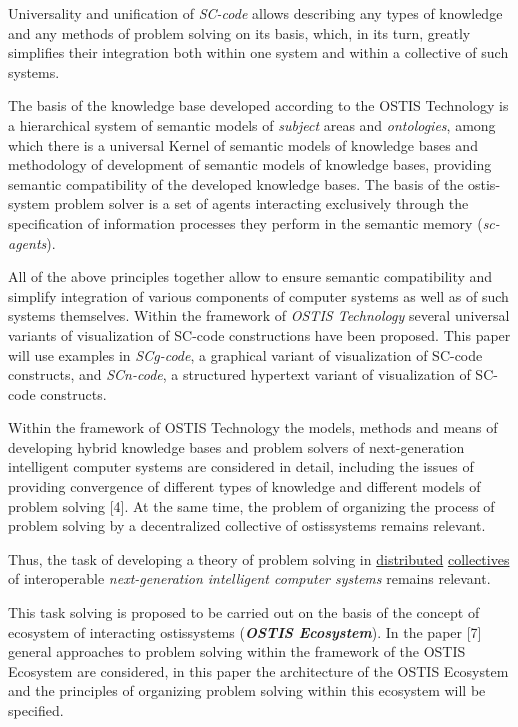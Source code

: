 \documentclass[a4paper,10pt]{article}
\begin{document}
\begin{multicols}{2}
Universality and unification of \textit{SC-code} allows describing any types of knowledge and any methods of problem
solving on its basis, which, in its turn, greatly simplifies
their integration both within one system and within a
collective of such systems. 


The basis of the knowledge base developed according
to the OSTIS Technology is a hierarchical system of
semantic models of \textit{subject} areas and \textit{ontologies}, among
which there is a universal Kernel of semantic models
of knowledge bases and methodology of development of
semantic models of knowledge bases, providing semantic
compatibility of the developed knowledge bases. The
basis of the ostis-system problem solver is a set of
agents interacting exclusively through the specification
of information processes they perform in the semantic
memory (\textit{sc-agents}). 


All of the above principles together allow to ensure
semantic compatibility and simplify integration of various components of computer systems as well as of
such systems themselves. Within the framework of \textit{OSTIS
Technology} several universal variants of visualization of
SC-code constructions have been proposed. This paper
will use examples in \textit{SCg-code}, a graphical variant of
visualization of SC-code constructs, and \textit{SCn-code}, a
structured hypertext variant of visualization of SC-code
constructs. 


Within the framework of OSTIS Technology the models, methods and means of developing hybrid knowledge
bases and problem solvers of next-generation intelligent
computer systems are considered in detail, including the
issues of providing convergence of different types of
knowledge and different models of problem solving [4].
At the same time, the problem of organizing the process
of problem solving by a decentralized collective of ostissystems remains relevant. 


Thus, the task of developing a theory of problem
solving in \underline{distributed} \underline{collectives} of interoperable \textit{next-generation intelligent computer systems} remains relevant. 


This task solving is proposed to be carried out on the
basis of the concept of ecosystem of interacting ostissystems (\textbf{\textit{OSTIS Ecosystem}}). In the paper [7] general
approaches to problem solving within the framework of
the OSTIS Ecosystem are considered, in this paper the
architecture of the OSTIS Ecosystem and the principles
of organizing problem solving within this ecosystem will
be specified. \\ 


\end{multicols}
\end{document}
